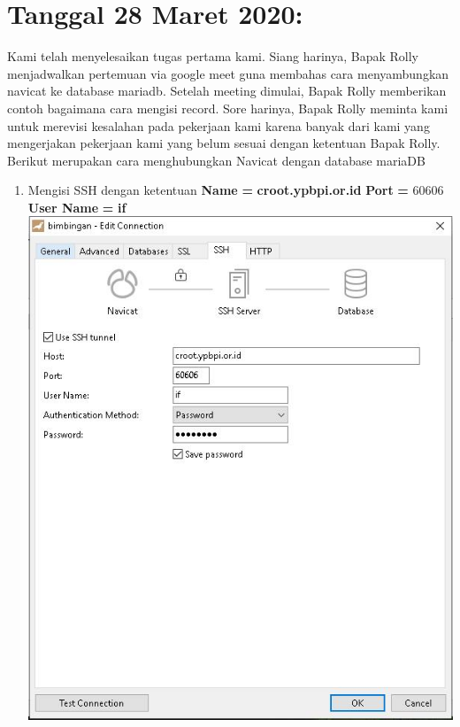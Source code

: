 \documentclass{article}
\begin{document}
\section{Tanggal 28 Maret 2020:}
Kami telah menyelesaikan tugas pertama kami. Siang harinya, Bapak Rolly menjadwalkan pertemuan via google meet guna membahas cara menyambungkan navicat ke database mariadb. Setelah meeting dimulai, Bapak Rolly memberikan contoh bagaimana cara mengisi record. Sore harinya, Bapak Rolly meminta kami untuk merevisi kesalahan pada pekerjaan kami karena banyak dari kami yang mengerjakan pekerjaan kami yang belum sesuai dengan ketentuan Bapak Rolly. Berikut merupakan cara menghubungkan Navicat dengan database mariaDB
\newline
\newline
\begin{enumerate}
    \item Mengisi SSH dengan ketentuan
            \textbf{Name}  \textbf{=} \textbf{croot.ypbpi.or.id} \newline \textbf{Port} \textbf{=} 60606 \newline \textbf{User Name} \textbf{=} \textbf{if}
            \newline
            \includegraphics[scale=0.4]{28.1.jpg}

\end{enumerate}
\end{document}
